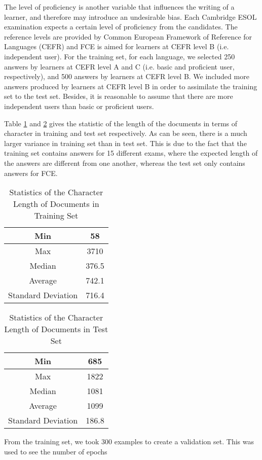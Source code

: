The level of proficiency is another variable that influences the writing of a learner, and therefore may introduce an undesirable bias.
Each Cambridge ESOL examination expects a certain level of proficiency from the candidates.
The reference levels are provided by Common European Framework of Reference for Languages (CEFR) \citep{council2001common} and FCE is aimed for learners at CEFR level B (i.e. independent user).
For the training set, for each language, we selected 250 answers by learners at CEFR level A and C (i.e. basic and proficient user, respectively), and 500 answers by learners at CEFR level B.
We included more answers produced by learners at CEFR level B in order to assimilate the training set to the test set.
Besides, it is reasonable to assume that there are more independent users than basic or proficient users.

Table \ref{tab:tr-stat} and \ref{tab:te-stat} gives the statistic of the length of the documents in terms of character in training and test set respectively.
As can be seen, there is a much larger variance in training set than in test set.
This is due to the fact that the training set contains answers for 15 different exams, where the expected length of the answers are different from one another, whereas the test set only contains answers for FCE.
\begin{table}[]
\centering
\caption{Statistics of the Character Length of Documents in Training Set}
\label{tab:tr-stat}
\begin{tabular}{|c|c|}
\hline
Min         & 58 \\ \hline
Max      & 3710     \\ \hline
Median    & 376.5    \\ \hline
Average & 742.1   \\ \hline
Standard Deviation    & 716.4   \\ \hline
\end{tabular}
\end{table}
\begin{table}[]
\centering
\caption{Statistics of the Character Length of Documents in Test Set}
\label{tab:te-stat}
\begin{tabular}{|c|c|}
\hline
Min         & 685\\ \hline
Max      & 1822     \\ \hline
Median    & 1081   \\ \hline
Average & 1099    \\ \hline
Standard Deviation    & 186.8    \\ \hline
\end{tabular}
\end{table}

From the training set, we took 300 examples to create a validation set.
This was used to see the number of epochs